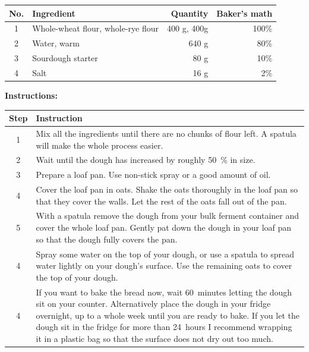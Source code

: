 \begin{center}
\begin{tabular}{|c|l|r|r|}
    \hline
    \textbf{No.} & \textbf{Ingredient} & \textbf{Quantity} & \textbf{Baker's math} \\
    \hline
    1 & Whole-wheat flour, whole-rye flour & 400 g, 400g & 100\% \\
    \hline
    2 & Water, warm & 640 g & 80\% \\
    \hline
    3 & Sourdough starter & 80 g & 10\% \\
    \hline
    4 & Salt & 16 g & 2\% \\
    \hline
\end{tabular}
\end{center}

\noindent\textbf{Instructions:}
\begin{center}
\begin{tabular}{|c|p{12cm}|}
    \hline
    \textbf{Step} & \textbf{Instruction} \\
    \hline
    1 & Mix all the ingredients until there are no chunks of
    flour left. A spatula will make the whole process easier. \\
    \hline
    2 & Wait until the dough has increased by roughly 50~\% in size. \\
    \hline
    3 & Prepare a loaf pan. Use non-stick spray or a good amount of oil. \\
    \hline
    4 & Cover the loaf pan in oats. Shake the oats thoroughly in the loaf
    pan so that they cover the walls. Let the rest of the oats fall out of the
    pan. \\
    \hline
    5 & With a spatula remove the dough from your bulk ferment container and
    cover the whole loaf pan. Gently pat down the dough in your loaf pan so
    that the dough fully covers the pan. \\
    \hline
    4 & Spray some water on the top of your dough, or use a spatula to spread
    water lightly on your dough's surface. Use the remaining oats to cover
    the top of your dough. \\
    \hline
    4 & If you want to bake the bread now, wait 60~minutes letting the dough
    sit on your counter. Alternatively place the dough in your fridge overnight,
    up to a whole week until you are ready to bake. If you let the dough sit
    in the fridge for more than 24~hours I recommend wrapping it in a plastic
    bag so that the surface does not dry out too much. \\
    \hline
\end{tabular}
\end{center}

